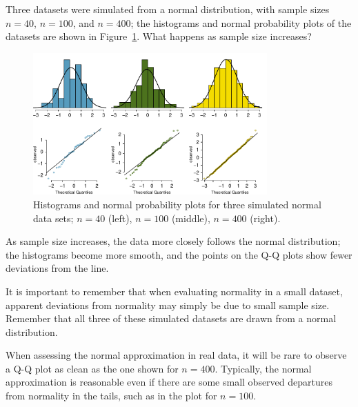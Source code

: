 \begin{example}{Three datasets were simulated from a normal distribution, with sample sizes $n = 40$, $n = 100$, and $n = 400$; the histograms and normal probability plots of the datasets are shown in Figure~\ref{normalExamples}. What happens as sample size increases?} \label{normalExamplesExample}

\begin{figure}[h!]
\centering
\includegraphics[width=0.80\textwidth]{ch_distributions_oi_biostat/figures/normalExamples/normalExamples}
\caption{Histograms and normal probability plots for three simulated normal data sets; $n=40$ (left), $n=100$ (middle), $n=400$ (right).}
\label{normalExamples}
\end{figure}

As sample size increases, the data more closely follows the normal distribution; the histograms become more smooth, and the points on the Q-Q plots show fewer deviations from the line.

It is important to remember that when evaluating normality in a small dataset, apparent deviations from normality may simply be due to small sample size. Remember that all three of these simulated datasets are drawn from a normal distribution.

When assessing the normal approximation in real data, it will be rare to observe a Q-Q plot as clean as the one shown for $n = 400$. Typically, the normal approximation is reasonable even if there are some small observed departures from normality in the tails, such as in the plot for $n = 100$.

\end{example}

\textC{\pagebreak}


